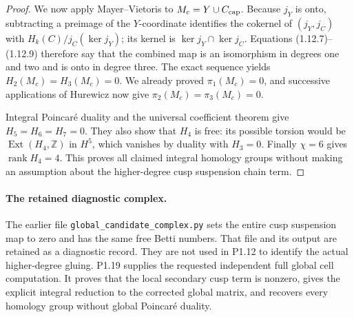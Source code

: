 \begin{proof}
We now apply Mayer--Vietoris to $M_c=Y\cup C_{\rm cap}$.
Because $j_Y$ is onto, subtracting a preimage of the $Y$-coordinate
identifies the cokernel of $(j_Y,j_C)$ with
$H_k(C)/j_C(\ker j_Y)$; its kernel is
$\ker j_Y\cap\ker j_C$.
Equations (1.12.7)--(1.12.9) therefore say that the combined map is an
isomorphism in degrees one and two and is onto in degree three.
The exact sequence yields $H_2(M_c)=H_3(M_c)=0$.
We already proved $\pi_1(M_c)=0$, and successive applications of
Hurewicz now give $\pi_2(M_c)=\pi_3(M_c)=0$.

Integral Poincar\'e duality and the universal coefficient theorem
give $H_5=H_6=H_7=0$.  They also show that $H_4$ is free: its possible
torsion would be $\operatorname{Ext}(H_4,\mathbb Z)$ in $H^5$, which
vanishes by duality with $H_3=0$.
Finally $\chi=6$ gives $\operatorname{rank}H_4=4$.
This proves all claimed integral homology groups without making an
assumption about the higher-degree cusp suspension chain term.
\end{proof}

\paragraph{The retained diagnostic complex.}
The earlier file \texttt{global\_candidate\_complex.py} sets the entire
cusp suspension map to zero and has the same free Betti numbers.
That file and its output are retained as a diagnostic record.  They
are not used in P1.12 to identify the actual higher-degree gluing.
P1.19 supplies the requested independent full global cell computation.
It proves that the local secondary cusp term is nonzero, gives the
explicit integral reduction to the corrected global matrix, and
recovers every homology group without global Poincar\'e duality.

